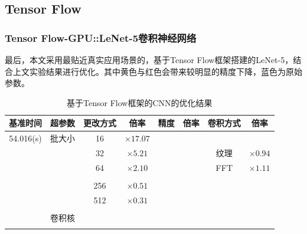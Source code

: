 \documentclass[10pt,aspectratio=169,mathserif]{beamer}
\begin{document}
	\subsection{Tensor Flow}
	\begin{frame}
		\frametitle{Tensor Flow-GPU::LeNet-5卷积神经网络}
		最后，本文采用最贴近真实应用场景的，基于Tensor Flow框架搭建的LeNet-5，结合上文实验结果进行优化。其中黄色与红色会带来较明显的精度下降，蓝色为原始参数。
		\begin{table}
			\centering
			\caption{基于Tensor Flow框架的CNN的优化结果}
			\begin{tabular}{cccccccc}
				\toprule
				基准时间 &  超参数 &更改方式 &倍率 & 精度 &倍率 & 卷积方式 &倍率 	\\
				\midrule
				54.016(s) & 批大小 & 16 & $ \times17.07 $ & \color[rgb]{0.3,0.4,1.0}{FP32} & \color[rgb]{0.3,0.4,1.0}{$ \times 1 $ } & \color[rgb]{0.3,0.4,1.0}{原始(GEMM)} &\color[rgb]{0.3,0.4,1.0}{$ \times 1 $} \\
				& & 32 & $ \times 5.21 $ & \color[rgb]{0.9,0.7,0.01}{FP16} & \color[rgb]{0.9,0.7,0.01}{$ \times 0.86 $} & 纹理 & $ \times 0.94 $\\
				& & 64 & $ \times 2.10 $ & \color[rgb]{0.9,0.7,0.01}{INT8} & \color[rgb]{0.9,0.7,0.01}{$ \times 0.82 $} & FFT & $ \times 1.11 $\\
				& & \color[rgb]{0.3,0.4,1.0}{128} & \color[rgb]{0.3,0.4,1.0}{$ \times 1 $}& & & & \\
				& & 256 & $ \times 0.51 $ & & & & \\
				& & 512 & $ \times 0.31 $ & & & & \\
				& & \color[rgb]{0.9,0.7,0.01}{1024} & \color[rgb]{0.9,0.7,0.01}{$ \times 0.21 $}& & & & \\
				& 卷积核 & \color[rgb]{0.3,0.4,1.0}{$ 5\times 5 $} & \color[rgb]{0.3,0.4,1.0}{$ \times 1 $} & & & & \\
				& & \color{red}{$ 8\times 8 $} & \color{red}{$ \times 0.97 $} & & & & \\
				\bottomrule
			\end{tabular} \label{table-TFRES} 
		\end{table}
	\end{frame}
	
\end{document}
